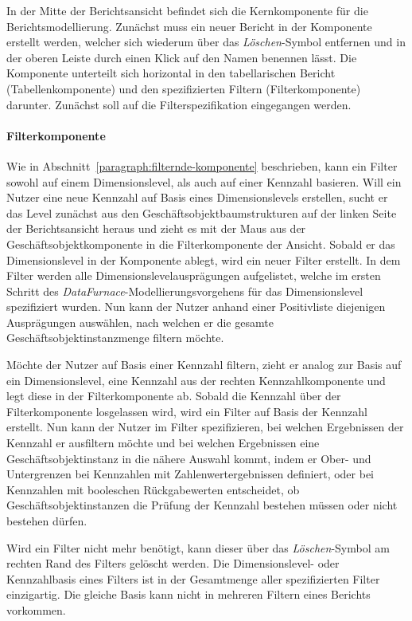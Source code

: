 \documentclass[
  language=german, %
  type=bachelor,%
  ngerman
]{isthesis}
\begin{document}
\begin{content}
  In der Mitte der Berichtsansicht befindet sich die Kernkomponente für die
  Berichtsmodellierung. Zunächst muss ein neuer Bericht
  in der Komponente erstellt werden, welcher sich wiederum über das
  \textit{Löschen}-Symbol entfernen und in der oberen Leiste durch einen Klick
  auf den Namen benennen lässt. Die Komponente unterteilt sich horizontal in
  den tabellarischen Bericht (Tabellenkomponente) und den spezifizierten
  Filtern (Filterkomponente) darunter. Zunächst soll auf die
  Filterspezifikation eingegangen werden. 
  
  \paragraph{Filterkomponente}
  
  Wie in Abschnitt~\ref{paragraph:filternde-komponente}
  beschrieben, kann ein Filter sowohl auf einem Dimensionslevel, als auch auf einer
  Kennzahl basieren. Will ein Nutzer eine neue Kennzahl auf Basis eines
  Dimensionslevels erstellen, sucht er das Level zunächst aus den
  Geschäftsobjektbaumstrukturen auf der linken Seite der Berichtsansicht heraus
  und zieht es mit der Maus aus der Geschäftsobjektkomponente in die
  Filterkomponente der Ansicht. Sobald er das Dimensionslevel in der Komponente
  ablegt, wird ein neuer Filter erstellt. In dem Filter werden alle
  Dimensionslevelausprägungen aufgelistet, welche im ersten Schritt des
  \textit{DataFurnace}-Modellierungsvorgehens für das Dimensionslevel
  spezifiziert wurden. Nun kann der Nutzer anhand einer Positivliste
  diejenigen Ausprägungen auswählen, nach welchen er die gesamte
  Geschäftsobjektinstanzmenge filtern möchte.

  Möchte der Nutzer auf Basis einer Kennzahl filtern, zieht er analog zur
  Basis auf ein Dimensionslevel, eine Kennzahl aus der rechten
  Kennzahlkomponente und legt diese in der Filterkomponente ab. Sobald die
  Kennzahl über der Filterkomponente losgelassen wird, wird ein Filter auf
  Basis der Kennzahl erstellt. Nun kann der Nutzer im Filter spezifizieren, bei
  welchen Ergebnissen der Kennzahl er ausfiltern möchte und bei welchen
  Ergebnissen eine Geschäftsobjektinstanz in die nähere Auswahl kommt,
  indem er \zB{} Ober- und Untergrenzen bei Kennzahlen mit
  Zahlenwertergebnissen definiert, oder bei Kennzahlen mit booleschen
  Rückgabewerten entscheidet, ob Geschäftsobjektinstanzen die Prüfung der
  Kennzahl bestehen müssen oder nicht bestehen dürfen.

  Wird ein Filter nicht mehr benötigt, kann dieser über das
  \textit{Löschen}-Symbol am rechten Rand des Filters gelöscht werden. Die
  Dimensionslevel- oder Kennzahlbasis eines Filters ist in der Gesamtmenge
  aller spezifizierten Filter einzigartig. Die gleiche Basis kann nicht in
  mehreren Filtern eines Berichts vorkommen.


\end{content}
\end{document}
